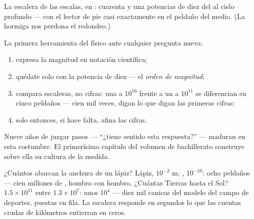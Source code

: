 \begin{omfigure}

{\small La escalera de las escalas, en : cuarenta y una
potencias de diez del  al cielo profundo --- con el lector de
pie casi exactamente en el peldaño del medio. (La hormiga nos perdona
el redondeo.)}
\end{omfigure}

\begin{method}\label{met:g9:atoms-to-galaxies:oom}
La primera herramienta del físico ante cualquier pregunta nueva:
\begin{enumerate}
  \item expresa la magnitud en notación científica;
  \item quédate solo con la potencia de diez --- el \emph{orden de
        magnitud};
  \item compara escaleras, no cifras: una  a $10^{16}$
         frente a un  a $10^{11}$ se
        diferencian en cinco peldaños --- cien mil veces, digan lo que
        digan las primeras cifras;
  \item solo entonces, si hace falta, afina las cifras.
\end{enumerate}
Nueve años de juzgar pasos --- ``¿tiene sentido esta respuesta?'' ---
maduran en esta costumbre. El primerísimo capítulo del volumen de
bachillerato construye sobre ella su cultura de la medida.
\end{method}

\begin{example}\label{ex:g9:atoms-to-galaxies:arithmetic}
¿Cuántos  abarcan la anchura de un lápiz? Lápiz, $10^{-2}$
\unit{m}; , $10^{-10}$: ocho peldaños --- cien millones de
, hombro con hombro. ¿Cuántas Tierras hasta el Sol? $1.5
\times 10^{11}$ entre $1.3 \times 10^{7}$: unos $10^{4}$ --- diez mil
canicas del modelo del campo de deportes, puestas en fila. La escalera
responde en segundos lo que las cuentas crudas de kilómetros entierran
en ceros.
\end{example}


